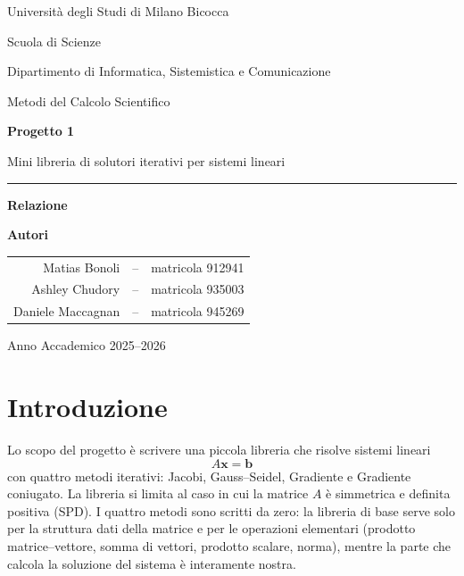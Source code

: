 \documentclass[11pt,a4paper]{article}
\begin{document}
\begin{titlepage}
\centering
\vspace*{2cm}

{\large Università degli Studi di Milano Bicocca\par}
{\large Scuola di Scienze\par}
{\large Dipartimento di Informatica, Sistemistica e Comunicazione\par}
\vspace{0.8cm}
{\large Metodi del Calcolo Scientifico\par}

\vspace{2.2cm}
{\Huge\bfseries Progetto 1\par}
\vspace{0.6cm}
{\Large Mini libreria di solutori iterativi per sistemi lineari\par}

\vspace{2.2cm}
\rule{0.55\textwidth}{0.4pt}\par
\vspace{0.6cm}
{\large\bfseries Relazione\par}
\vspace{0.6cm}

\vspace{1.0cm}
{\Large \bfseries Autori\par}
\vspace{0.4cm}
{\large
\begin{tabular}{rcl}
Matias Bonoli & -- & matricola 912941 \\
Ashley Chudory & -- & matricola 935003 \\
Daniele Maccagnan & -- & matricola 945269
\end{tabular}\par
}

\vfill
{\large Anno Accademico 2025--2026\par}
\end{titlepage}
\tableofcontents
\newpage

\section{Introduzione}
Lo scopo del progetto è scrivere una piccola libreria che risolve sistemi
lineari
\[
A\mathbf{x}=\mathbf{b}
\]
con quattro metodi iterativi: Jacobi, Gauss--Seidel, Gradiente e Gradiente
coniugato. La libreria si limita al caso in cui la matrice $A$ è simmetrica e
definita positiva (SPD). I quattro metodi sono scritti da zero: la libreria di
base serve solo per la struttura dati della matrice e per le operazioni
elementari (prodotto matrice--vettore, somma di vettori, prodotto scalare,
norma), mentre la parte che calcola la soluzione del sistema è interamente
nostra.
\end{document}

